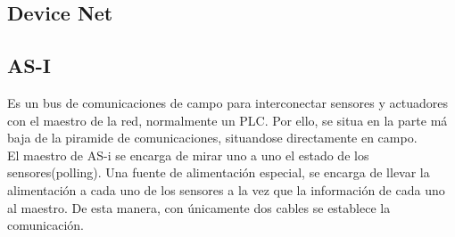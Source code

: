 \subsection{Device Net}
\label{comunic_device}



\subsection{AS-I}
\label{comunic_asi}
Es un bus de comunicaciones de campo para interconectar sensores y actuadores con el maestro de la red, normalmente un PLC. Por ello, se situa en la parte má baja de la piramide de comunicaciones, situandose directamente en campo.\\

El maestro de AS-i se encarga de mirar uno a uno el estado de los sensores(polling). Una fuente de alimentación especial, se encarga de llevar la alimentación a cada uno de los sensores a la vez que la información de cada uno al maestro. De esta manera, con únicamente dos cables se establece la comunicación.\\



